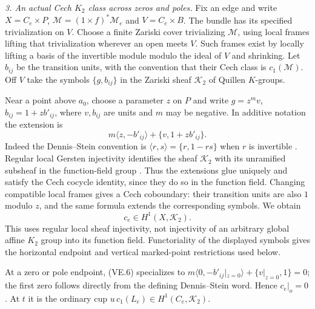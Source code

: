 \emph{3. An actual Cech $K_2$ class across zeros and poles.}
Fix an edge and write $X=C_e\times P$,
$\mathcal M=(1\times f)^*\mathcal M_e$ and $V=C_e\times B$.
The bundle has its specified trivialization on $V$.
Choose a finite Zariski cover trivializing $\mathcal M$, using local
frames lifting that trivialization wherever an open meets $V$.
Such frames exist by locally lifting a basis of the invertible
module modulo the ideal of $V$ and shrinking.
Let $b_{ij}$ be the transition units, with the convention that
their Cech class is $c_1(\mathcal M)$.
Off $V$ take the symbols $\{g,b_{ij}\}$ in the Zariski sheaf
$\mathcal K_2$ of Quillen $K$-groups.

Near a point above $a_0$, choose a parameter $z$ on $P$ and write
$g=z^m v$, $b_{ij}=1+z b'_{ij}$, where $v,b_{ij}$ are units and
$m$ may be negative. In additive notation the extension is
\begin{equation}
        m\langle z,-b'_{ij}\rangle+\{v,1+z b'_{ij}\}.
                                                               \tag{VE.6}
\end{equation}
Indeed the Dennis--Stein convention is
$\langle r,s\rangle=\{r,1-rs\}$ when $r$ is invertible
\citep[Chapter III, Definition 5.11 and identities D1--D3,
pp.~43--44]{frWeibelKbookIII}.
Regular local Gersten injectivity identifies the sheaf $\mathcal K_2$
with its unramified subsheaf in the function-field group
\citep[Section 7, Theorem 5.11 and the preceding Gersten complex]
{rootQuillen1973}.
Thus the extensions glue uniquely and satisfy the Cech cocycle
identity, since they do so in the function field.
Changing compatible local frames gives a Cech coboundary: their
transition units are also $1$ modulo $z$, and the same formula
extends the corresponding symbols. We obtain
\begin{equation}
                         c_e\in H^1(X,\mathcal K_2).      \tag{VE.7}
\end{equation}
This uses regular local sheaf injectivity, not injectivity of an
arbitrary global affine $K_2$ group into its function field.
Functoriality of the displayed symbols gives the horizontal endpoint
and vertical marked-point restrictions used below.

At a zero or pole endpoint, (VE.6) specializes to
$m\langle0,-b'_{ij}|_{z=0}\rangle+\{v|_{z=0},1\}=0$;
the first zero follows directly from the defining Dennis--Stein
word. Hence $c_e|_o=0$. At $t$ it is the ordinary cup
$u\,c_1(L_e)\in H^1(C_e,\mathcal K_2)$.

